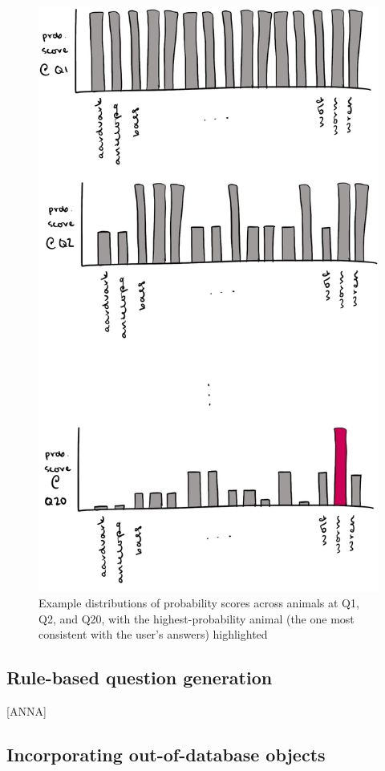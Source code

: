 \documentclass[11pt,a4paper]{article}
\begin{document}
\begin{figure}
	\includegraphics[width=.8\linewidth]{graphics/Bayesian-updating.png}
	\caption{Example distributions of probability scores across animals at Q1, Q2, and Q20, with the highest-probability animal (the one most consistent with the user's answers) highlighted}
	\label{fig:bayesian-update}
\end{figure}

\subsection{Rule-based question generation}
\label{subsec:qg}

[ANNA]


\subsection{Incorporating out-of-database objects}
\label{subsec:out-of-db}
\end{document}
